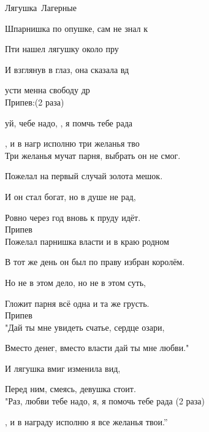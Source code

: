 \documentclass[11pt,a5paper]{book}
\renewcommand{\tt}{\indent \indent}
\begin{document}
\begin{song}{Лягушка}{}{~}{Лагерные}{}{}

Шпарнишка по опушке, сам не знал к\par
Пти нашел лягушку около пру\par
И взглянув в глаз, она сказала вд\par
{}усти менна свободу др\\
 
Припев:(2 раза)\par
{}уй, чебе надо, , я помчь тебе рада \par
\tt{}, и в нагр исполню  три желанья тво\\

Три желанья мучат парня, выбрать он не смог.\par
Пожелал на первый случай золота мешок.\par
И он стал богат, но в душе не рад,\par
Ровно через год вновь к пруду идёт.\\

Припев\\

Пожелал парнишка власти и в краю родном \par
В тот же день он был по праву избран королём.\par
Но не в этом дело, но не в этом суть,\par
Гложит парня всё одна и та же грусть.\\


Припев\\

"Дай ты мне увидеть счатье, сердце озари,\par
Вместо денег, вместо власти дай ты мне любви."\par
И лягушка вмиг изменила вид,\par
Перед ним, смеясь, девушка стоит.\\
\tt"Раз, любви тебе надо, я, я помочь тебе рада (2 раза)\par		
{}, и в награду исполню я все желанья твои.”\\


\end{song}
\end{document}

